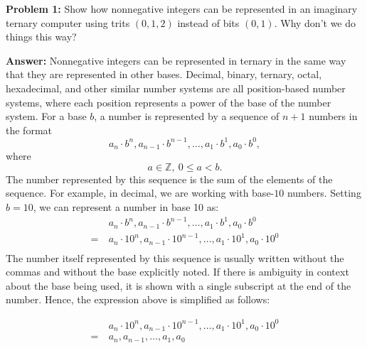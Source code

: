 \documentclass[12pt,letterpaper,final]{report}
\begin{document}
\vline


\noindent\textbf{Problem 1:}  Show how nonnegative integers can be represented in an imaginary ternary computer using trits $(0,1,2)$ instead of bits $(0,1)$. Why don't we do things this way?

\noindent\textbf{Answer:}
Nonnegative integers can be represented in ternary in the same way that they are represented in other bases. Decimal, binary, ternary, octal, hexadecimal, and other similar number systems are all position-based number systems, where each position represents a power of the base of the number system. For a base $b$, a number is represented by a sequence of $n+1$ numbers in the format
\[a_{n} \cdot b^{n},a_{n-1} \cdot b^{n-1},\ldots,a_{1} \cdot b^{1},a_{0} \cdot b^{0},\]
where \[a \in \mathbb{Z},\ 0 \le a < b.\]
The number represented by this sequence is the sum of the elements of the sequence. For example, in decimal, we are working with base-$10$ numbers. Setting $b=10$, we can represent a number in base 10 as:
\begin{align*}
      & a_{n} \cdot b^{n},a_{n-1} \cdot b^{n-1},\ldots,a_{1} \cdot b^{1},a_{0} \cdot b^{0}     \\
  =\  & a_{n} \cdot 10^{n},a_{n-1} \cdot 10^{n-1},\ldots,a_{1} \cdot 10^{1},a_{0} \cdot 10^{0} \\
\end{align*}
The number itself represented by this sequence is usually written without the commas and without the base explicitly noted. If there is ambiguity in context about the base being used, it is shown with a single subscript at the end of the number. Hence, the expression above is simplified as follows:

\begin{align*}
      & a_{n} \cdot 10^{n},a_{n-1} \cdot 10^{n-1},\ldots,a_{1} \cdot 10^{1},a_{0} \cdot 10^{0} \\
  =\  & a_{n},a_{n-1},\ldots,a_{1},a_{0}                                                       \\
\end{align*}
\end{document}
